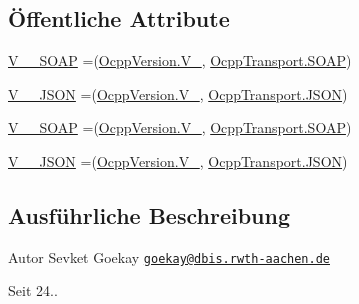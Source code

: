 \subsection*{Öffentliche Attribute}
\begin{DoxyCompactItemize}
\item 
\hyperlink{enumde_1_1rwth_1_1idsg_1_1steve_1_1ocpp_1_1_ocpp_protocol_a8d3c28a7f752ada8544f49a26fd75bf9}{V\+\_\+\_\+\+S\+O\+A\+P} =(\hyperlink{enumde_1_1rwth_1_1idsg_1_1steve_1_1ocpp_1_1_ocpp_version_a02a262b834136db4a30bb9a821c77574}{Ocpp\+Version.\+V\+\_}, \hyperlink{enumde_1_1rwth_1_1idsg_1_1steve_1_1ocpp_1_1_ocpp_transport_ae1fa7bdd519c49e7c5d175538ec2eb47}{Ocpp\+Transport.\+S\+O\+A\+P})
\item 
\hyperlink{enumde_1_1rwth_1_1idsg_1_1steve_1_1ocpp_1_1_ocpp_protocol_a0b890b1200cee602749371f323d0a686}{V\+\_\+\_\+\+J\+S\+O\+N} =(\hyperlink{enumde_1_1rwth_1_1idsg_1_1steve_1_1ocpp_1_1_ocpp_version_a02a262b834136db4a30bb9a821c77574}{Ocpp\+Version.\+V\+\_}, \hyperlink{enumde_1_1rwth_1_1idsg_1_1steve_1_1ocpp_1_1_ocpp_transport_aa9ac4184d327d7868285a13790f45cdc}{Ocpp\+Transport.\+J\+S\+O\+N})
\item 
\hyperlink{enumde_1_1rwth_1_1idsg_1_1steve_1_1ocpp_1_1_ocpp_protocol_a7476dab1a43648c24ed27bb7a6dc4cc1}{V\+\_\+\_\+\+S\+O\+A\+P} =(\hyperlink{enumde_1_1rwth_1_1idsg_1_1steve_1_1ocpp_1_1_ocpp_version_a73e998996dec6fa643fc3241249866d4}{Ocpp\+Version.\+V\+\_}, \hyperlink{enumde_1_1rwth_1_1idsg_1_1steve_1_1ocpp_1_1_ocpp_transport_ae1fa7bdd519c49e7c5d175538ec2eb47}{Ocpp\+Transport.\+S\+O\+A\+P})
\item 
\hyperlink{enumde_1_1rwth_1_1idsg_1_1steve_1_1ocpp_1_1_ocpp_protocol_a80b0fbd3a74af3443ec943f4e32fe7fa}{V\+\_\+\_\+\+J\+S\+O\+N} =(\hyperlink{enumde_1_1rwth_1_1idsg_1_1steve_1_1ocpp_1_1_ocpp_version_a73e998996dec6fa643fc3241249866d4}{Ocpp\+Version.\+V\+\_}, \hyperlink{enumde_1_1rwth_1_1idsg_1_1steve_1_1ocpp_1_1_ocpp_transport_aa9ac4184d327d7868285a13790f45cdc}{Ocpp\+Transport.\+J\+S\+O\+N})
\end{DoxyCompactItemize}


\subsection{Ausführliche Beschreibung}
\begin{DoxyAuthor}{Autor}
Sevket Goekay \href{mailto:goekay@dbis.rwth-aachen.de}{\tt goekay@dbis.\+rwth-\/aachen.\+de} 
\end{DoxyAuthor}
\begin{DoxySince}{Seit}
24.. 
\end{DoxySince}


